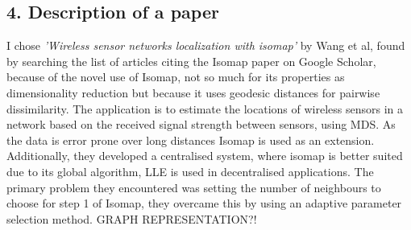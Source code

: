 \documentclass{article}
\begin{document}
\subsection{4. Description of a paper}
I chose \textit {'Wireless sensor networks localization with isomap'} by Wang et al,\cite{wang2009wireless} found by searching the list of articles citing the Isomap paper on Google Scholar, because of the novel use of Isomap, not so much for its properties as dimensionality reduction but because it uses geodesic distances for pairwise dissimilarity. The application is to estimate the locations of wireless sensors in a network based on the received signal strength between sensors, using MDS. As the data is error prone over long distances  Isomap is used as an extension. Additionally, they developed a centralised system, where isomap is better suited due to its global algorithm, LLE is used in decentralised applications.\cite{patwari2004manifold} The primary problem they encountered was setting the number of neighbours to choose for step 1 of Isomap, they overcame this by using an adaptive parameter selection method.
GRAPH REPRESENTATION?!
{}

\end{document}
